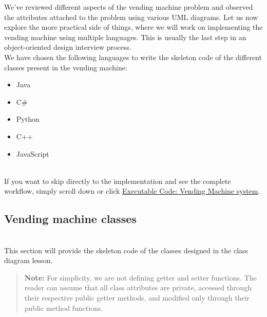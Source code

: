 

We've reviewed different aspects of the vending machine problem and observed the attributes attached to the problem using various UML diagrams. Let us now explore the more practical side of things, where we will work on implementing the vending machine using multiple languages. This is usually the last step in an object-oriented design interview process.
\\
We have chosen the following languages to write the skeleton code of the different classes present in the vending machine:

\begin{itemize}
\item
\protect{}\label{xxqLi_iRC1y_E4voVN1LZ}
Java
\item
\protect{}\label{2prKR2E0HRs-7MH2KES1T}
C\#
\item
\protect{}\label{iovjOaMCCGVy7usCBmt29}
Python
\item
\protect{}\label{mts-Gd4wrtYXKOna3C9un}
C++
\item
\protect{}\label{xreHb10shtd1z_K9PGo0j}
JavaScript
\end{itemize}
\\
If you want to skip directly to the implementation and see the complete workflow, simply scroll down or click \hyperref[Executable-code-Vending-machine]{Executable Code: Vending Machine system}.

\subsection{Vending machine classes}\label{QHN0J5Js0HfV6qMIBi3BG}
\\
This section will provide the skeleton code of the classes designed in the class diagram lesson.
\begin{quote}
\textbf{Note:} For simplicity, we are not defining getter and setter functions. The reader can assume that all class attributes are private, accessed through their respective public getter methods, and modified only through their public method functions.
\end{quote}
